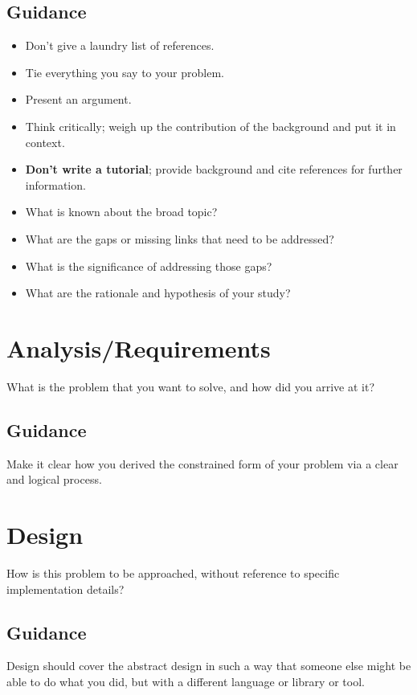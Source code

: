 \documentclass{l4proj}
\begin{document}
\section{Guidance}
\begin{itemize}    
    \item
      Don't give a laundry list of references.
    \item
      Tie everything you say to your problem.
    \item
      Present an argument.
    \item Think critically; weigh up the contribution of the background and put it in context.    
    \item
      \textbf{Don't write a tutorial}; provide background and cite
      references for further information.
   \item What is known about the broad topic?
 \item What are the gaps or missing links that need to be addressed? 
 \item What is the significance of addressing those gaps?
 \item What are the rationale and hypothesis of your study?
\end{itemize}

\chapter{Analysis/Requirements}
What is the problem that you want to solve, and how did you arrive at it?
\section{Guidance}
Make it clear how you derived the constrained form of your problem via a clear and logical process. 

\chapter{Design}
How is this problem to be approached, without reference to specific implementation details? 
\section{Guidance}
Design should cover the abstract design in such a way that someone else might be able to do what you did, but with a different language or library or tool.
\end{document}
